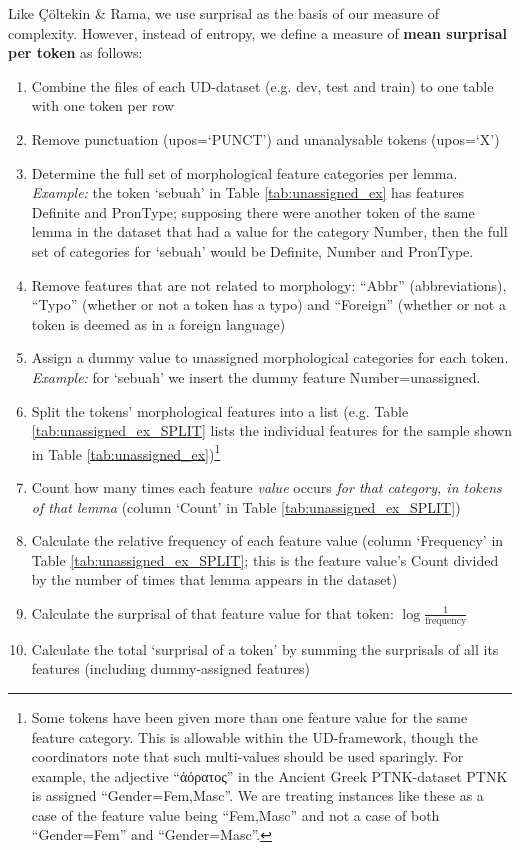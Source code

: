 \documentclass[USenglish]{article}
\begin{document}
Like Çöltekin \& Rama, we use surprisal as the basis of our measure of complexity.
However, instead of entropy, we define a measure of \textbf{mean surprisal per token} as follows:
\begin{enumerate}
\item Combine the files of each UD-dataset (e.g. dev, test and train) to one table with one token per row
\item Remove punctuation (upos=`PUNCT') and unanalysable tokens (upos=`X')
\item Determine the full set of morphological feature categories per lemma. \textit{Example:} the token `sebuah' in Table \ref{tab:unassigned_ex} has features Definite and PronType; supposing there were another token of the same lemma in the dataset that had a value for the category Number, then the full set of categories for `sebuah' would be Definite, Number and PronType.
\item Remove features that are not related to morphology: ``Abbr'' (abbreviations), ``Typo'' (whether or not a token has a typo) and ``Foreign'' (whether or not a token is deemed as in a foreign language)
\item Assign a dummy value to unassigned morphological categories for each token. \textit{Example:} for `sebuah' we insert the dummy feature Number=unassigned.
\item Split the tokens' morphological features into a list (e.g. Table \ref{tab:unassigned_ex_SPLIT} lists the individual features for the sample shown in Table \ref{tab:unassigned_ex})\footnote{Some tokens have been given more than one feature value for the same feature category. This is allowable within the UD-framework, though the coordinators note that such multi-values should be used sparingly. For example, the adjective ``ἀόρατος'' in the Ancient Greek PTNK-dataset PTNK is assigned ``Gender=Fem,Masc''. We are treating instances like these as a case of the feature value being ``Fem,Masc'' and not a case of both ``Gender=Fem'' and ``Gender=Masc''.}
\item Count how many times each feature \textit{value} occurs \textit{for that category, in tokens of that lemma} (column `Count' in Table \ref{tab:unassigned_ex_SPLIT})
\item Calculate the relative frequency of each feature value (column `Frequency' in Table \ref{tab:unassigned_ex_SPLIT}; this is the feature value's Count divided by the number of times that lemma appears in the dataset)
\item Calculate the surprisal of that feature value for that token: $\log{\frac{1}{\text{frequency}}}$
\item Calculate the total `surprisal of a token' by summing the surprisals of all its features (including dummy-assigned features)
\end{enumerate}
\end{document}
